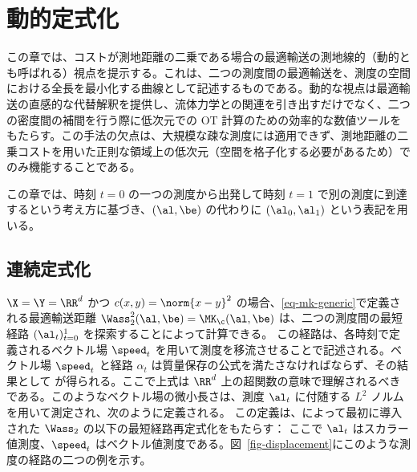 
\chapter{動的定式化}
\label{c-dynamic}

この章では、コストが測地距離の二乗である場合の最適輸送の測地線的（動的とも呼ばれる）視点を提示する。これは、二つの測度間の最適輸送を、測度の空間における全長を最小化する曲線として記述するものである。動的な視点は最適輸送の直感的な代替解釈を提供し、流体力学との関連を引き出すだけでなく、二つの密度間の補間を行う際に低次元での OT 計算のための効率的な数値ツールをもたらす。この手法の欠点は、大規模な疎な測度には適用できず、測地距離の二乗コストを用いた正則な領域上の低次元（空間を格子化する必要があるため）でのみ機能することである。

この章では、時刻 $t=0$ の一つの測度から出発して時刻 $t=1$ で別の測度に到達するという考え方に基づき、$(\al,\be)$ の代わりに $(\al_0,\al_1)$ という表記を用いる。

\section{連続定式化}

$\X=\Y=\RR^d$ かつ $c(x,y)=\norm{x-y}^2$ の場合、\eqref{eq-mk-generic}で定義される最適輸送距離 $\Wass_2^2(\al,\be) = \MK_\c(\al,\be)$ は、二つの測度間の最短経路 $(\al_t)_{t=0}^1$ を探索することによって計算できる。
%
この経路は、各時刻で定義されるベクトル場 $\speed_t$ を用いて測度を移流させることで記述される。ベクトル場 $\speed_t$ と経路 $\alpha_t$ は質量保存の公式を満たさなければならず、その結果として
が得られる。ここで上式は $\RR^d$ 上の超関数の意味で理解されるべきである。このようなベクトル場の微小長さは、測度 $\al_t$ に付随する $L^2$ ノルムを用いて測定され、次のように定義される。
この定義は、\citet{benamou2000computational}によって最初に導入された $\Wass_2$ の以下の最短経路再定式化をもたらす：
ここで $\al_t$ はスカラー値測度、$\speed_t$ はベクトル値測度である。図~\ref{fig-displacement}にこのような測度の経路の二つの例を示す。


